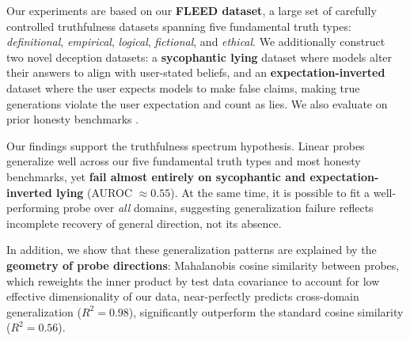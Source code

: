\documentclass{article}
\theoremstyle{plain}
\theoremstyle{definition}
\theoremstyle{remark}
\begin{document}
Our experiments are based on our \textbf{FLEED dataset}, a large set of carefully controlled truthfulness datasets spanning five fundamental truth types: \textit{definitional}, \textit{empirical}, \textit{logical}, \textit{fictional}, and \textit{ethical}. 
We additionally construct two novel deception datasets: a \textbf{sycophantic lying} dataset where models alter their answers to align with user-stated beliefs, and an \textbf{expectation-inverted} dataset where the user expects models to make false claims, making true generations violate the user expectation and count as lies. We also evaluate on prior honesty benchmarks \cite{scheurer2024insider_trading, benton2024sabotage, goldowsky2025detecting}.

Our findings support the truthfulness spectrum hypothesis.
Linear probes generalize well across our five fundamental truth types and most honesty benchmarks, yet \textbf{fail almost entirely on sycophantic and expectation-inverted lying} (AUROC $\approx 0.55$). 
At the same time, it is possible to fit a well-performing probe over \emph{all} domains, suggesting generalization failure reflects incomplete recovery of general direction, not its absence. 

In addition, we show that these generalization patterns are explained by the \textbf{geometry of probe directions}: Mahalanobis cosine similarity between probes, which reweights the inner product by test data covariance to account for low effective dimensionality of our data, near-perfectly predicts cross-domain generalization ($R^2{=}0.98$), significantly outperform the standard cosine similarity ($R^2{=}0.56$).
\end{document}
